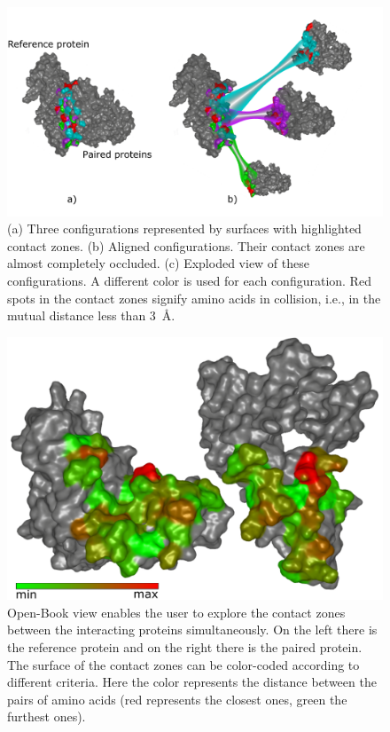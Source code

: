 \documentclass{bmcart}
\def\OpBook {Open-Book view\xspace}
\def\ExpView {Exploded view\xspace}
\begin{document}
\begin{backmatter}
\begin{figure}[h!]
    \centering
    \includegraphics[width=\columnwidth]{images/figure5.pdf}
    \caption{
    (a) Three configurations represented by surfaces with highlighted contact zones. (b) Aligned configurations. Their contact zones are almost completely occluded. (c) \ExpView of these configurations. A different color is used for each configuration. Red spots in the contact zones signify amino acids in collision, i.e., in the mutual distance less than 3~\AA.}
	\label{fig:case12}
\end{figure}

\begin{figure}[h!]
  \centering
  \includegraphics[width=\columnwidth]{images/figure6.pdf}
  \caption{\csentence{\OpBook.} \OpBook enables the user to explore the contact zones between the interacting proteins simultaneously. On the left there is the reference protein and on the right there is the paired protein. The surface of the contact zones can be color-coded according to different criteria. Here the color represents the distance between the pairs of amino acids (red represents the closest ones, green the furthest ones).}
  \label{fig:book}
\end{figure}


\end{backmatter}
\end{document}
